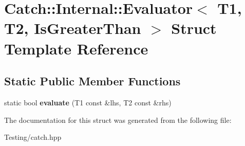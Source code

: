 \hypertarget{struct_catch_1_1_internal_1_1_evaluator_3_01_t1_00_01_t2_00_01_is_greater_than_01_4}{\section{Catch\-:\-:Internal\-:\-:Evaluator$<$ T1, T2, Is\-Greater\-Than $>$ Struct Template Reference}
\label{struct_catch_1_1_internal_1_1_evaluator_3_01_t1_00_01_t2_00_01_is_greater_than_01_4}
}
\subsection*{Static Public Member Functions}
\begin{DoxyCompactItemize}
\item 
\hypertarget{struct_catch_1_1_internal_1_1_evaluator_3_01_t1_00_01_t2_00_01_is_greater_than_01_4_a55745f74f09ac5c61bd3d592ca5560af}{static bool {\bfseries evaluate} (T1 const \&lhs, T2 const \&rhs)}\label{struct_catch_1_1_internal_1_1_evaluator_3_01_t1_00_01_t2_00_01_is_greater_than_01_4_a55745f74f09ac5c61bd3d592ca5560af}

\end{DoxyCompactItemize}


The documentation for this struct was generated from the following file\-:\begin{DoxyCompactItemize}
\item 
Testing/catch.\-hpp\end{DoxyCompactItemize}
